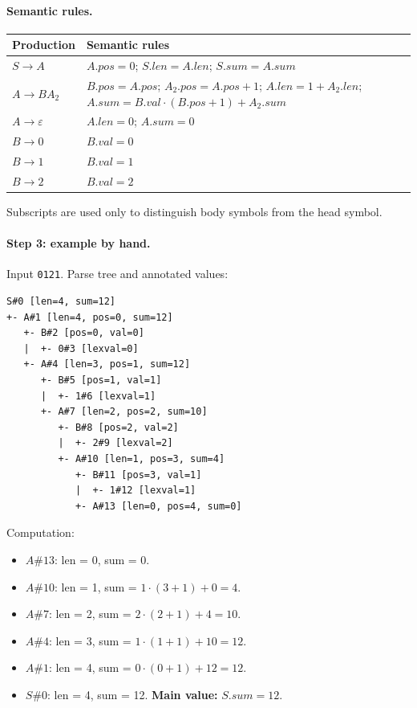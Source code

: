 \documentclass[11pt]{article}
\begin{document}
\paragraph{Semantic rules.}
\begin{center}
\begin{tabular}{ll}
\toprule
Production & Semantic rules \\
\midrule
$S\to A$ & $A.pos=0$;\; $S.len=A.len$;\; $S.sum=A.sum$ \\
$A\to B A_2$ & $B.pos=A.pos$;\; $A_2.pos=A.pos+1$;\; $A.len=1+A_2.len$;\; $A.sum=B.val\cdot(B.pos+1)+A_2.sum$ \\
$A\to\varepsilon$ & $A.len=0$;\; $A.sum=0$ \\
$B\to 0$ & $B.val=0$ \\
$B\to 1$ & $B.val=1$ \\
$B\to 2$ & $B.val=2$ \\
\bottomrule
\end{tabular}
\end{center}
Subscripts are used only to distinguish body symbols from the head symbol.

\paragraph{Step 3: example by hand.} Input \texttt{0121}. Parse tree and
annotated values:
\begin{verbatim}
S#0 [len=4, sum=12]
+- A#1 [len=4, pos=0, sum=12]
   +- B#2 [pos=0, val=0]
   |  +- 0#3 [lexval=0]
   +- A#4 [len=3, pos=1, sum=12]
      +- B#5 [pos=1, val=1]
      |  +- 1#6 [lexval=1]
      +- A#7 [len=2, pos=2, sum=10]
         +- B#8 [pos=2, val=2]
         |  +- 2#9 [lexval=2]
         +- A#10 [len=1, pos=3, sum=4]
            +- B#11 [pos=3, val=1]
            |  +- 1#12 [lexval=1]
            +- A#13 [len=0, pos=4, sum=0]
\end{verbatim}

Computation:
\begin{itemize}
\item $A\#13$: len = 0, sum = 0.
\item $A\#10$: len = 1, sum = $1\cdot(3+1)+0 = 4$.
\item $A\#7$: len = 2, sum = $2\cdot(2+1)+4 = 10$.
\item $A\#4$: len = 3, sum = $1\cdot(1+1)+10 = 12$.
\item $A\#1$: len = 4, sum = $0\cdot(0+1)+12 = 12$.
\item $S\#0$: len = 4, sum = 12. \textbf{Main value:} $S.sum = 12$.
\end{itemize}
\end{document}
